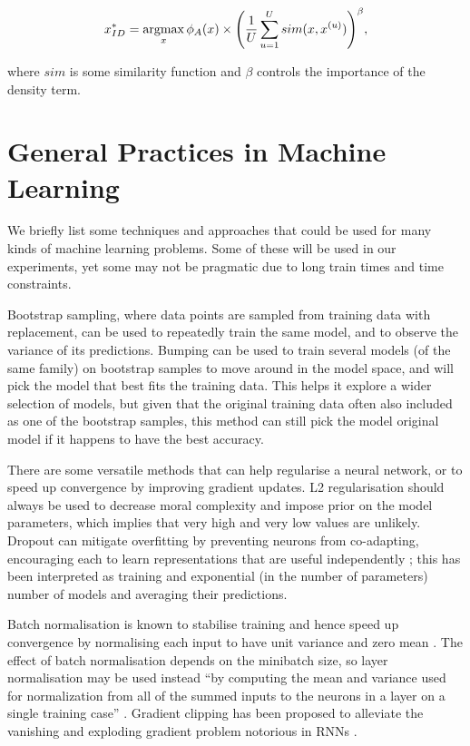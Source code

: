 \begin{equation}
 x^*_{ID} = \operatorname*{argmax}_x \phi_A(x) \times \Bigg( \frac{1}{U} \sum_{u=1}^U sim(x, x^{(u)}) \Bigg)^\beta,
\end{equation}

where $sim$ is some similarity function and $\beta$ controls the importance of the density term.

\section{General Practices in Machine Learning}
\label{bg_general}

We briefly list some techniques and approaches that could be used for many kinds of machine learning problems.
Some of these will be used in our experiments, yet some may not be pragmatic due to long train times and time constraints.

Bootstrap sampling, where data points are sampled from training data with replacement, can be used to repeatedly train the same model, and to observe the variance of its predictions.
Bumping can be used to train several models (of the same family) on bootstrap samples to move around in the model space, and will pick the model that best fits the training data.
This helps it explore a wider selection of models, but given that the original training data often also included as one of the bootstrap samples, this method  can still pick the model original model if it happens to have the best accuracy.

There are some versatile methods that can help regularise a neural network, or to speed up convergence by improving  gradient updates.
L2  regularisation should always be used to decrease moral complexity and impose prior on the model parameters, which  implies that very high and very low values are unlikely.
Dropout can mitigate overfitting by preventing neurons from co-adapting, encouraging each to learn representations that are useful independently \cite{dropout}; this has been interpreted as training and exponential (in the number of parameters) number of models and averaging their predictions.

Batch normalisation is known to stabilise training and hence speed up convergence  by normalising each input to have unit variance and zero mean \cite{batch_norm}.
The effect of batch normalisation depends on the minibatch size, so layer normalisation may be used instead ``by computing the mean and variance used for normalization from all of the summed inputs to the neurons in a layer on a single training case'' \cite{layer_norm}.
Gradient clipping has been proposed to alleviate the vanishing and exploding gradient problem notorious in RNNs \cite{grad_clip}.

